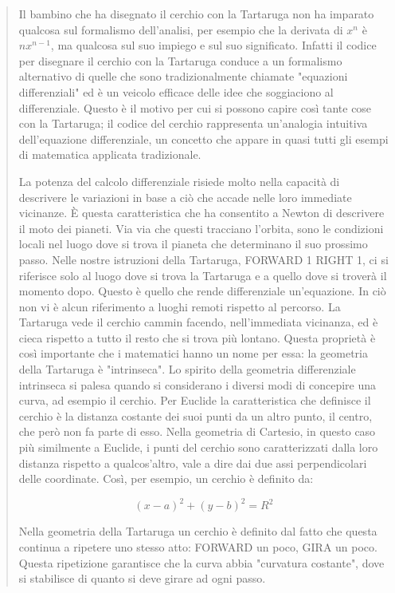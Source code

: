 \begin{quote}

Il bambino che ha disegnato il cerchio con la Tartaruga non ha imparato qualcosa sul formalismo dell'analisi, per esempio che la derivata di $x^n$ è $nx^{n-1}$, ma qualcosa sul suo impiego e sul suo significato. Infatti il codice per disegnare il cerchio con la Tartaruga conduce a un formalismo alternativo di quelle che sono tradizionalmente chiamate "equazioni differenziali" ed è un veicolo efficace delle idee che soggiaciono al differenziale. Questo è il motivo per cui si possono capire così tante cose con la Tartaruga; il  codice del cerchio rappresenta un'analogia intuitiva dell'equazione differenziale, un concetto che appare in quasi tutti gli esempi di matematica applicata tradizionale.

La potenza del calcolo differenziale risiede molto nella capacità di descrivere le variazioni in base a ciò che accade nelle loro immediate vicinanze. È questa caratteristica che ha consentito a Newton di descrivere il moto dei pianeti. Via via che questi tracciano l'orbita, sono le condizioni locali nel luogo dove si trova il pianeta che determinano il suo prossimo passo. Nelle nostre istruzioni della Tartaruga, FORWARD 1 RIGHT 1, ci si riferisce solo al luogo dove si trova la Tartaruga e a quello dove si troverà il momento dopo. Questo è quello che rende differenziale un'equazione. In ciò non vi è alcun riferimento a luoghi remoti rispetto al percorso. La Tartaruga vede il cerchio cammin facendo, nell'immediata vicinanza, ed è cieca rispetto a tutto il resto che si trova più lontano. Questa proprietà è così importante che i matematici hanno un nome per essa: la geometria della Tartaruga è "intrinseca". Lo spirito della geometria differenziale intrinseca si palesa quando si considerano i diversi modi di concepire una curva, ad esempio il  cerchio. Per Euclide la caratteristica che definisce il cerchio è la distanza costante dei suoi punti da un altro punto, il centro, che però non fa parte di esso. Nella geometria di Cartesio, in questo caso più similmente a Euclide, i punti del cerchio sono caratterizzati dalla loro distanza rispetto a qualcos'altro, vale a dire dai due assi perpendicolari delle coordinate. Così, per esempio, un cerchio è definito da:

\begin{equation}
(x-a)^2+(y-b)^2= R^2
\end{equation}

Nella geometria della Tartaruga un cerchio è definito dal fatto che questa continua a ripetere uno stesso atto: FORWARD un poco, GIRA un poco. Questa ripetizione garantisce che la curva abbia "curvatura costante", dove si stabilisce di quanto si deve girare ad ogni passo.


\end{quote}
